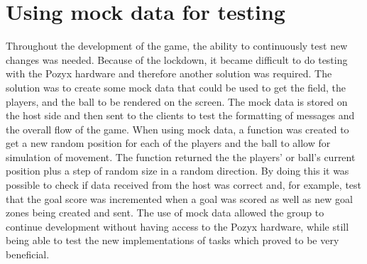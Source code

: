 \section{Using mock data for testing}
Throughout the development of the game, the ability to continuously test new changes was needed.
Because of the lockdown, it became difficult to do testing with the Pozyx hardware and therefore another solution was required.
The solution was to create some mock data that could be used to get the field, the players, and the ball to be rendered on the screen.
The mock data is stored on the host side and then sent to the clients to test the formatting of messages and the overall flow of the game.
When using mock data, a function was created to get a new random position for each of the players and the ball to allow for simulation of movement.
The function returned the the players' or ball's current position plus a step of random size in a random direction.
By doing this it was possible to check if data received from the host was correct and, for example, test that the goal score was incremented when a goal was scored as well as new goal zones being created and sent.
The use of mock data allowed the group to continue development without having access to the Pozyx hardware, while still being able to test the new implementations of tasks which proved to be very beneficial.